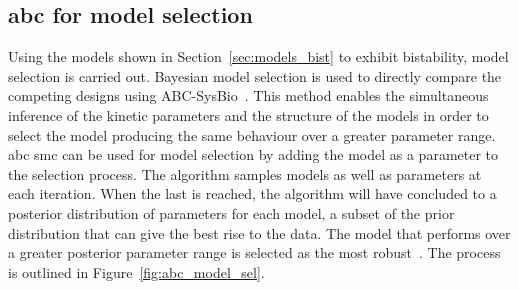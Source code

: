 \clearpage






\subsection{\acrlong{abc} for model selection}

Using the models shown in Section~\ref{sec:models_bist} to exhibit bistability, model selection is carried out. Bayesian model selection is used to directly compare the competing designs using ABC-SysBio~\autocite{Liepe:2010eg}. This method enables the simultaneous inference of the kinetic parameters and the structure of the models in order to select the model producing the same behaviour over a greater parameter range. \acrshort{abc} \acrshort{smc} can be used for model selection by adding the model as a parameter to the selection process. The algorithm samples models as well as parameters at each iteration. When the last \textepsilon{} is reached, the algorithm will have concluded to a posterior distribution of parameters for each model, a subset of the prior distribution that can give the best rise to the data. The model that performs over a greater posterior parameter range is selected as the most robust~\autocite{Toni:2009tr}. The process is outlined in Figure~\ref{fig:abc_model_sel}.
    

